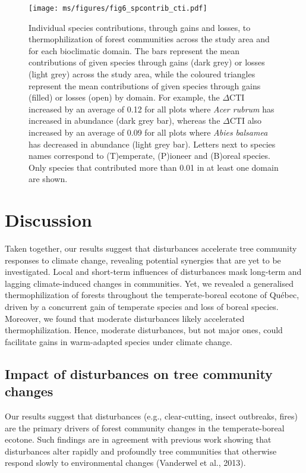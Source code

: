 \documentclass[
  a4paperpaper,
]{article}
\begin{document}
\begin{figure}
\centering
\texttt{[image: ms/figures/fig6\_spcontrib\_cti.pdf]}
\caption{Individual species contributions, through gains and losses, to
thermophilization of forest communities across the study area and for
each bioclimatic domain. The bars represent the mean contributions of
given species through gains (dark grey) or losses (light grey) across
the study area, while the coloured triangles represent the mean
contributions of given species through gains (filled) or losses (open)
by domain. For example, the \(\Delta\)CTI increased by an average of
0.12 for all plots where \emph{Acer rubrum} has increased in abundance
(dark grey bar), whereas the \(\Delta\)CTI also increased by an average
of 0.09 for all plots where \emph{Abies balsamea} has decreased in
abundance (light grey bar). Letters next to species names correspond to
(T)emperate, (P)ioneer and (B)oreal species. Only species that
contributed more than 0.01 in at least one domain are shown.}
\end{figure}

\hypertarget{discussion}{%
\section{Discussion}\label{discussion}}

Taken together, our results suggest that disturbances accelerate tree
community responses to climate change, revealing potential synergies
that are yet to be investigated. Local and short-term influences of
disturbances mask long-term and lagging climate-induced changes in
communities. Yet, we revealed a generalised thermophilization of forests
throughout the temperate-boreal ecotone of Québec, driven by a
concurrent gain of temperate species and loss of boreal species.
Moreover, we found that moderate disturbances likely accelerated
thermophilization. Hence, moderate disturbances, but not major ones,
could facilitate gains in warm-adapted species under climate change.

\hypertarget{impact-of-disturbances-on-tree-community-changes}{%
\subsection{Impact of disturbances on tree community
changes}\label{impact-of-disturbances-on-tree-community-changes}}

Our results suggest that disturbances (e.g., clear-cutting, insect
outbreaks, fires) are the primary drivers of forest community changes in
the temperate-boreal ecotone. Such findings are in agreement with
previous work showing that disturbances alter rapidly and profoundly
tree communities that otherwise respond slowly to environmental changes
(Vanderwel et al., 2013).
\end{document}
